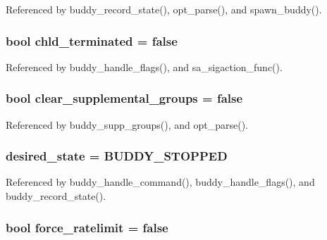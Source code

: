 Referenced by buddy\_\-record\_\-state(), opt\_\-parse(), and spawn\_\-buddy().

\subsubsection[{chld\_\-terminated}]{\setlength{\rightskip}{0pt plus 5cm}bool {\bf chld\_\-terminated} = false\hspace{0.3cm}{\ttfamily  [static]}}\label{buddy_8c_ac7d1b197ce100f66f7fd13dc10b94154}


Referenced by buddy\_\-handle\_\-flags(), and sa\_\-sigaction\_\-func().

\subsubsection[{clear\_\-supplemental\_\-groups}]{\setlength{\rightskip}{0pt plus 5cm}bool {\bf clear\_\-supplemental\_\-groups} = false}\label{buddy_8c_a535a3bdf28e5f018da53680703092e1b}


Referenced by buddy\_\-supp\_\-groups(), and opt\_\-parse().

\subsubsection[{desired\_\-state}]{ {\bf desired\_\-state} = BUDDY\_\-STOPPED\hspace{0.3cm}{\ttfamily  [static]}}\label{buddy_8c_a05901f7b8d5bf031b62c57221a69bff3}


Referenced by buddy\_\-handle\_\-command(), buddy\_\-handle\_\-flags(), and buddy\_\-record\_\-state().

\subsubsection[{force\_\-ratelimit}]{\setlength{\rightskip}{0pt plus 5cm}bool {\bf force\_\-ratelimit} = false\hspace{0.3cm}{\ttfamily  [static]}}\label{buddy_8c_a3e2d3cd0fd4a7c47cc37451ae453bf29}


